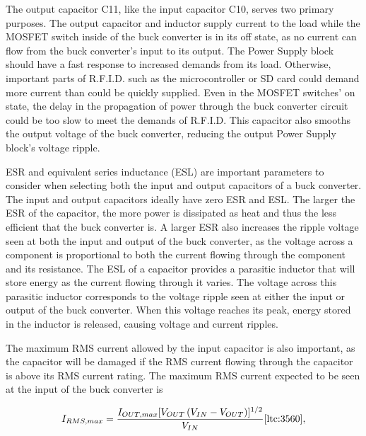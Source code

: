 The output capacitor C11, like the input capacitor C10, serves two primary purposes. The output capacitor and inductor supply current to the load while the MOSFET switch inside of the buck converter is in its off state, as no current can flow from the buck converter's input to its output. The Power Supply block should have a fast response to increased demands from its load. Otherwise, important parts of R.F.I.D. such as the microcontroller or SD card could demand more current than could be quickly supplied. Even in the MOSFET switches' on state, the delay in the propagation of power through the buck converter circuit could be too slow to meet the demands of R.F.I.D. This capacitor also smooths the output voltage of the buck converter, reducing the output Power Supply block's voltage ripple.  

ESR and equivalent series inductance (ESL) are important parameters to consider when selecting both the input and output capacitors of a buck converter. The input and output capacitors ideally have zero ESR and ESL. The larger the ESR of the capacitor, the more power is dissipated as heat and thus the less efficient that the buck converter is. A larger ESR also increases the ripple voltage seen at both the input and output of the buck converter, as the voltage across a component is proportional to both the current flowing through the component and its resistance. The ESL of a capacitor provides a parasitic inductor that will store energy as the current flowing through it varies. The voltage across this parasitic inductor corresponds to the voltage ripple seen at either the input or output of the buck converter. When this voltage reaches its peak, energy stored in the inductor is released, causing voltage and current ripples.

The maximum RMS current allowed by the input capacitor is also important, as the capacitor will be damaged if the RMS current flowing through the capacitor is above its RMS current rating. The maximum RMS current expected to be seen at the input of the buck converter is  

\begin{equation}
\label{eq:rms_max}
    I_{RMS,max} = \frac{I_{OUT,max}[V_{OUT}\left(V_{IN}-V_{OUT}\right)]^{1/2}}{V_{IN}} \cite{ltc:3560},
\end{equation}

